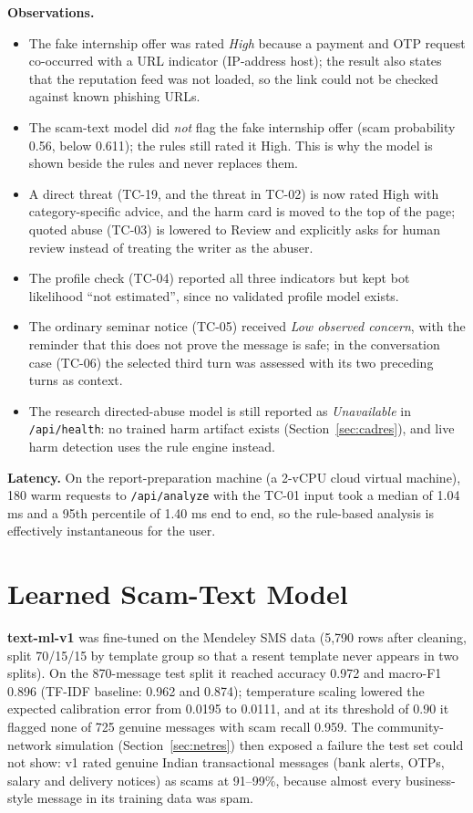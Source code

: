 \noindent\textbf{Observations.}
\begin{itemize}
\item The fake internship offer was rated \emph{High} because a payment and OTP request co-occurred with a URL indicator (IP-address host); the result also states that the reputation feed was not loaded, so the link could not be checked against known phishing URLs.
\item The scam-text model did \emph{not} flag the fake internship offer (scam probability 0.56, below 0.611); the rules still rated it High. This is why the model is shown beside the rules and never replaces them.
\item A direct threat (TC-19, and the threat in TC-02) is now rated High with category-specific advice, and the harm card is moved to the top of the page; quoted abuse (TC-03) is lowered to Review and explicitly asks for human review instead of treating the writer as the abuser.
\item The profile check (TC-04) reported all three indicators but kept bot likelihood ``not estimated'', since no validated profile model exists.
\item The ordinary seminar notice (TC-05) received \emph{Low observed concern}, with the reminder that this does not prove the message is safe; in the conversation case (TC-06) the selected third turn was assessed with its two preceding turns as context.
\item The research directed-abuse model is still reported as \emph{Unavailable} in \texttt{/api/health}: no trained harm artifact exists (Section~\ref{sec:cadres}), and live harm detection uses the rule engine instead.
\end{itemize}

\noindent\textbf{Latency.} On the report-preparation machine (a 2-vCPU cloud virtual machine), 180 warm requests to \texttt{/api/analyze} with the TC-01 input took a median of 1.04 ms and a 95th percentile of 1.40 ms end to end, so the rule-based analysis is effectively instantaneous for the user.

\section{Learned Scam-Text Model}\label{sec:textres}
\noindent \textbf{text-ml-v1} was fine-tuned on the Mendeley SMS data (5,790 rows after cleaning, split 70/15/15 by template group so that a resent template never appears in two splits). On the 870-message test split it reached accuracy 0.972 and macro-F1 0.896 (TF-IDF baseline: 0.962 and 0.874); temperature scaling lowered the expected calibration error from 0.0195 to 0.0111, and at its threshold of 0.90 it flagged none of 725 genuine messages with scam recall 0.959. The community-network simulation (Section~\ref{sec:netres}) then exposed a failure the test set could not show: v1 rated genuine Indian transactional messages (bank alerts, OTPs, salary and delivery notices) as scams at 91--99\%, because almost every business-style message in its training data was spam.\\

